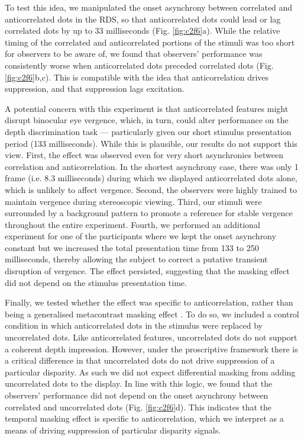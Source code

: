 To test this idea, we manipulated the onset asynchrony between correlated and anticorrelated dots in the RDS, so that anticorrelated dots could lead or lag correlated dots by up to 33 milliseconds (Fig. \ref{fig:c2f6}a). While the relative timing of the correlated and anticorrelated portions of the stimuli was too short for observers to be aware of, we found that observers' performance was consistently worse when anticorrelated dots preceded correlated dots (Fig. \ref{fig:c2f6}b,c). This is compatible with the idea that anticorrelation drives suppression, and that suppression lags excitation.

A potential concern with this experiment is that anticorrelated features might disrupt binocular eye vergence, which, in turn, could alter performance on the depth discrimination task --- particularly given our short stimulus presentation period (133 milliseconds). While this is plausible, our results do not support this view. First, the effect was observed even for very short asynchronies between correlation and anticorrelation. In the shortest asynchrony case, there was only 1 frame (i.e. 8.3 milliseconds) during which we displayed anticorrelated dots alone, which is unlikely to affect vergence. Second, the observers were highly trained to maintain vergence during stereoscopic viewing. Third, our stimuli were surrounded by a background pattern to promote a reference for stable vergence throughout the entire experiment. Fourth, we performed an additional experiment for one of the participants where we kept the onset asynchrony constant but we increased the total presentation time from 133 to 250 milliseconds, thereby allowing the subject to correct a putative transient disruption of vergence. The effect persisted, suggesting that the masking effect did not depend on the stimulus presentation time.

Finally, we tested whether the effect was specific to anticorrelation, rather than being a generalised metacontrast masking effect \cite{breitmeyer1984visual}. To do so, we included a control condition in which anticorrelated dots in the stimulus were replaced by uncorrelated dots. Like anticorrelated features, uncorrelated dots do not support a coherent depth impression. However, under the proscriptive framework there is a critical difference in that uncorrelated dots do not drive suppression of a particular disparity. As such we did not expect differential masking from adding uncorrelated dots to the display. In line with this logic, we found that the observers' performance did not depend on the onset asynchrony between correlated and uncorrelated dots (Fig. \ref{fig:c2f6}d). This indicates that the temporal masking effect is specific to anticorrelation, which we interpret as a means of driving suppression of particular disparity signals.

